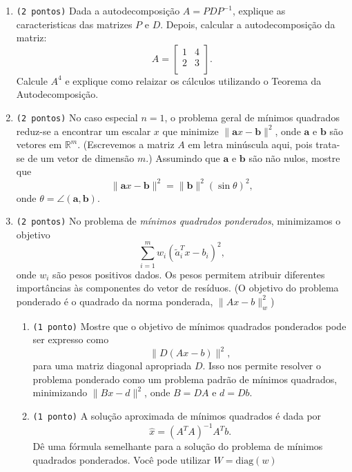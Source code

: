 \documentclass[a4paper,12pt]{article}
\begin{document}
\begin{enumerate}
    \item \texttt{(2 pontos)} Dada a autodecomposição $A = P D P^{-1}$, explique as caracteristicas das matrizes $P$ e $D$. Depois, calcular a autodecomposição da matriz:
    $$
    A = \begin{bmatrix}
        1 & 4\\
        2 & 3\\
    \end{bmatrix}.
    $$
    Calcule $A^4$ e explique como relaizar os cálculos utilizando o Teorema da Autodecomposição.

    \item \texttt{(2 pontos)} No caso especial $n = 1$, o problema geral de mínimos quadrados reduz-se a encontrar um escalar $x$ que minimize $\|\mathbf{a}x - \mathbf{b}\|^2$, onde $\mathbf{a}$ e $\mathbf{b}$ são vetores em $\mathbb{R}^m$. (Escrevemos a matriz $A$ em letra minúscula aqui, pois trata-se de um vetor de dimensão $m$.) Assumindo que $\mathbf{a}$ e $\mathbf{b}$ são não nulos, mostre que
    $$
    \|\mathbf{a}x - \mathbf{b}\|^2 = \|\mathbf{b}\|^2 (\sin \theta)^2,
    $$
    onde $\theta = \angle(\mathbf{a}, \mathbf{b})$.
    

    \item \texttt{(2 pontos)} No problema de \emph{mínimos quadrados ponderados}, minimizamos o objetivo
    \[
    \sum_{i=1}^m w_i (\tilde{a}_i^T x - b_i)^2,
    \]
    onde $w_i$ são pesos positivos dados.  
    Os pesos permitem atribuir diferentes importâncias às componentes do vetor de resíduos.  
    (O objetivo do problema ponderado é o quadrado da norma ponderada,
    $\|Ax - b\|_w^2$)

    \begin{enumerate}
        \item \texttt{(1 ponto)} Mostre que o objetivo de mínimos quadrados ponderados pode ser expresso como
        \[
        \|D(Ax - b)\|^2,
        \]
        para uma matriz diagonal apropriada $D$.  
        Isso nos permite resolver o problema ponderado como um problema padrão de mínimos quadrados,  
        minimizando $\|Bx - d\|^2$, onde $B = DA$ e $d = Db$.

        \item \texttt{(1 ponto)} A solução aproximada de mínimos quadrados é dada por  
        \[
            \hat{x} = (A^T A)^{-1} A^T b.
        \]
        Dê uma fórmula semelhante para a solução do problema de mínimos quadrados ponderados. Você pode utilizar $W = \text{diag}(w)$
    \end{enumerate}
\end{enumerate}
\end{document}
